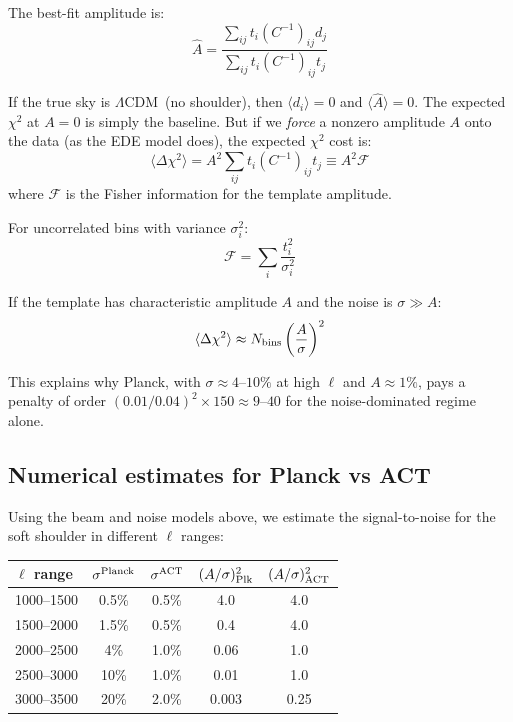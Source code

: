 \documentclass[twocolumn,showpacs,preprintnumbers,amsmath,amssymb,prd]{revtex4-2}
\newcommand{\lcdm}{$\Lambda$CDM}
\begin{document}
The best-fit amplitude is:
\begin{equation}
\hat A = \frac{\sum_{ij} t_i (C^{-1})_{ij} d_j}{\sum_{ij} t_i (C^{-1})_{ij} t_j}
\end{equation}

If the true sky is \lcdm\ (no shoulder), then $\langle d_i \rangle = 0$ and 
$\langle \hat A \rangle = 0$. The expected $\chi^2$ at $A = 0$ is simply the 
baseline. But if we \emph{force} a nonzero amplitude $A$ onto the data 
(as the EDE model does), the expected $\chi^2$ cost is:
\begin{equation}
\langle \Delta\chi^2 \rangle = A^2 \sum_{ij} t_i (C^{-1})_{ij} t_j \equiv A^2 \mathcal{F}
\end{equation}
where $\mathcal{F}$ is the Fisher information for the template amplitude.

For uncorrelated bins with variance $\sigma_i^2$:
\begin{equation}
\mathcal{F} = \sum_i \frac{t_i^2}{\sigma_i^2}
\end{equation}

If the template has characteristic amplitude $A$ and the noise is $\sigma \gg A$:
\begin{equation}
\langle \Delta\chi^2 \rangle \approx N_{\rm bins} \left(\frac{A}{\sigma}\right)^2
\end{equation}

This explains why Planck, with $\sigma \approx 4$--$10\%$ at high $\ell$ and 
$A \approx 1\%$, pays a penalty of order $(0.01/0.04)^2 \times 150 \approx 9$--$40$ 
for the noise-dominated regime alone.

\subsection{Numerical estimates for Planck vs ACT}

Using the beam and noise models above, we estimate the signal-to-noise for 
the soft shoulder in different $\ell$ ranges:

\begin{center}
\begin{tabular}{lcccc}
\toprule
$\ell$ range & $\sigma^{\rm Planck}$ & $\sigma^{\rm ACT}$ & $(A/\sigma)^2_{\rm Plk}$ & $(A/\sigma)^2_{\rm ACT}$ \\
\midrule
1000--1500 & 0.5\% & 0.5\% & 4.0 & 4.0 \\
1500--2000 & 1.5\% & 0.5\% & 0.4 & 4.0 \\
2000--2500 & 4\% & 1.0\% & 0.06 & 1.0 \\
2500--3000 & 10\% & 1.0\% & 0.01 & 1.0 \\
3000--3500 & 20\% & 2.0\% & 0.003 & 0.25 \\
\bottomrule
\end{tabular}
\end{center}
\end{document}
